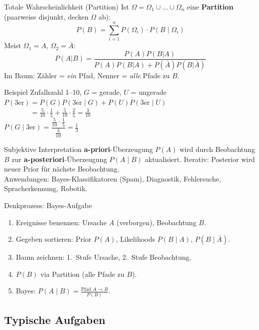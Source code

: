 \documentclass[a4paper, fontsize=7pt]{scrartcl}
\begin{document}
\begin{mainbox}{Totale Wahrscheinlichkeit (Partition)}
Ist $\Omega = \Omega_1 \cup \ldots \cup \Omega_n$ eine \textbf{Partition}
(paarweise disjunkt, decken $\Omega$ ab):
$$\boxed{P(B) = \sum_{i=1}^{n} P(\Omega_i) \cdot P(B \mid \Omega_i)}$$
Meist $\Omega_1 = A$, $\Omega_2 = \overline{A}$:
$$P(A|B) = \frac{P(A)P(B|A)}{P(A)P(B|A) + P(\bar{A})P(B|\bar{A})}$$
Im Baum: Zähler = \emph{ein} Pfad, Nenner = \emph{alle} Pfade zu $B$.
\end{mainbox}

\begin{subbox}{Beispiel Zufallszahl 1--10, $G$ = gerade, $U$ = ungerade}
$P(\text{3er}) = P(G)P(\text{3er} \mid G) + P(U)P(\text{3er} \mid U)$\\
$\phantom{P(\text{3er})} = \frac{5}{10}\cdot\frac{1}{5} +
\frac{5}{10}\cdot\frac{2}{5} = \frac{3}{10}$\\
$P(G \mid \text{3er}) = \dfrac{\frac{5}{10} \cdot \frac{1}{5}}{\frac{3}{10}}
= \frac{1}{3}$
\end{subbox}

\begin{mainbox}{Subjektive Interpretation}
\textbf{a-priori}-Überzeugung $P(A)$ wird durch Beobachtung $B$ zur
\textbf{a-posteriori}-Überzeugung $P(A \mid B)$ aktualisiert.
Iterativ: Posterior wird neuer Prior für nächste Beobachtung.\\
Anwendungen: Bayes-Klassifikatoren (Spam), Diagnostik, Fehlersuche,
Spracherkennung, Robotik.
\end{mainbox}

\begin{subbox}{Denkprozess: Bayes-Aufgabe}
\begin{enumerate}
    \item Ereignisse benennen: Ursache $A$ (verborgen), Beobachtung $B$.
    \item Gegeben sortieren: Prior $P(A)$, Likelihoods $P(B \mid A)$,
          $P(B \mid \overline{A})$.
    \item Baum zeichnen: 1.\ Stufe Ursache, 2.\ Stufe Beobachtung.
    \item $P(B)$ via Partition (alle Pfade zu $B$).
    \item Bayes: $P(A \mid B) = \frac{\text{Pfad } A \to B}{P(B)}$.
\end{enumerate}
\end{subbox}

\subsection{Typische Aufgaben}
\end{document}
